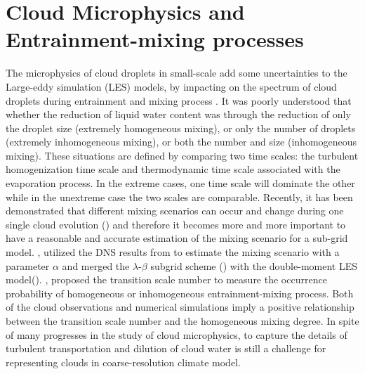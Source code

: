 \section{Cloud Microphysics and Entrainment-mixing processes}
The microphysics of cloud droplets in small-scale add some uncertainties to the
Large-eddy simulation (LES) models, by impacting on the spectrum of cloud
droplets during entrainment and mixing process  \cite{Jarecka2013}. It was
poorly understood that whether the reduction of liquid water content was
through the reduction of only the droplet size (extremely homogeneous mixing),
or only the number of droplets (extremely inhomogeneous mixing), or both the
number and size (inhomogeneous mixing). These situations are defined by
comparing two time scales: the turbulent homogenization time scale and
thermodynamic time scale associated with the evaporation process. In the
extreme cases, one time scale will dominate the other while in the unextreme
case the two scales are comparable. Recently, it has been demonstrated that
different mixing scenarios can occur and change during one single cloud
evolution (\cite{And09,Burnet07,Lehmann09}) and therefore it becomes more and
more important to have a reasonable and accurate estimation of the mixing
scenario for a sub-grid model. \cite{Jarecka2013}, utilized the DNS results
from \cite{And04,And06,And09}  to estimate the mixing scenario with a parameter
$\alpha$ and merged the $\lambda$-$\beta$ subgrid scheme (\cite{Jarecka2009})
with the double-moment LES model(\cite{Morrison2008}). \cite{Lu2013}, proposed
the transition scale number to measure the occurrence probability of
homogeneous or inhomogeneous entrainment-mixing process. Both of the cloud
observations and numerical simulations imply a positive relationship between
the transition scale number and the homogeneous mixing degree. In spite of many
progresses in the study of cloud microphysics, to capture the details of
turbulent transportation and dilution of cloud water is still a challenge for
representing clouds in coarse-resolution climate model.

